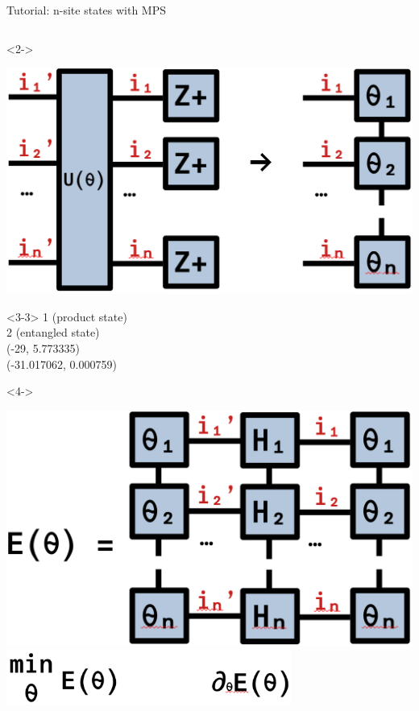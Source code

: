 \begin{frame}[fragile]{Tutorial: n-site states with MPS}
\begin{columns}
\begin{column}{4.5cm}
\begin{onlyenv}<2->
\vspace*{0.0cm}
\begin{center}
\includegraphics[width=\textwidth]{
  slides/assets/U_Zpn.png
}
\end{center}
\vspace*{0.0cm}
\end{onlyenv}

\begin{onlyenv}<3-3>
1 (product state) \\
2 (entangled state) \\
(-29, 5.773335) \\
(-31.017062, 0.000759)
\end{onlyenv}

\begin{onlyenv}<4->
\vspace*{0.0cm}
\begin{center}
\includegraphics[width=1.0\textwidth]{
  slides/assets/thetan_H_thetan.png
} \\
\includegraphics[width=0.7\textwidth]{
  slides/assets/min_grad_E_theta.png
}
\end{center}
\vspace*{0.0cm}
\end{onlyenv}

\end{column}

\end{columns}

\end{frame}
